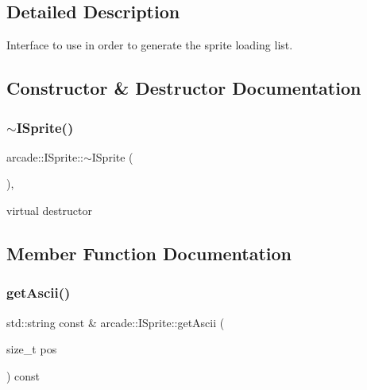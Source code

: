 \subsection{Detailed Description}
Interface to use in order to generate the sprite loading list. 

\subsection{Constructor \& Destructor Documentation}
\mbox{\label{classarcade_1_1_i_sprite_aa52abc5d79f3afa9ae82696d3bf9d3d3}} 
\subsubsection{\texorpdfstring{$\sim$\+I\+Sprite()}{~ISprite()}}
{\footnotesize\ttfamily arcade\+::\+I\+Sprite\+::$\sim$\+I\+Sprite (\begin{DoxyParamCaption}{ }\end{DoxyParamCaption})\hspace{0.3cm}{\ttfamily [inline]}, {\ttfamily [virtual]}}



virtual destructor 



\subsection{Member Function Documentation}
\mbox{\label{classarcade_1_1_i_sprite_aa3ab1b0c35f865d38e82b6fb0abce20a}} 
\subsubsection{\texorpdfstring{get\+Ascii()}{getAscii()}}
{\footnotesize\ttfamily std\+::string const  \& arcade\+::\+I\+Sprite\+::get\+Ascii (\begin{DoxyParamCaption}\item[{size\+\_\+t}]{pos }\end{DoxyParamCaption}) const\hspace{0.3cm}{\ttfamily [pure virtual]}}



